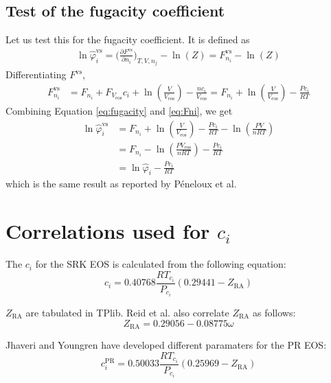 \documentclass[english]{../thermomemo/thermomemo}
\newcommand{\eos}{\ensuremath{\text{eos}}\xspace}
\begin{document}
\subsection{Test of the fugacity coefficient}
Let us test this for the fugacity coefficient. It is defined as
\begin{align}
  \ln \hat{\varphi}_i^{\text{vs}} = \biggl( \frac{\partial F^{\text{vs}}}{\partial n_i} \biggr)_{T,V,n_j} - \ln \left( Z \right) = F_{n_i}^{\text{vs}} - \ln \left( Z \right)
  \label{eq:fugacity}
\end{align}
Differentiating $F^{\text{vs}}$,
\begin{align}
  F_{n_i}^{\text{vs}} &= F_{n_i} + F_{V_{\eos}}c_i  + \ln \left(\frac{V}{V_{\eos}} \right) - \frac{n c_i}{V_{\eos}} = F_{n_i} + \ln \left(\frac{V}{V_{\eos}} \right) - \frac{P c_i}{RT}
  \label{eq:Fni}
\end{align}
Combining Equation \ref{eq:fugacity} and \ref{eq:Fni}, we get
\begin{align}
  \ln \hat{\varphi}_i^{\text{vs}} &= F_{n_i} + \ln \left(\frac{V}{V_{\eos}} \right) - \frac{P c_i}{RT} - \ln \left( \frac{PV}{n RT} \right) \\
                      &= F_{n_i} - \ln \left( \frac{PV_{\eos}}{n RT} \right) - \frac{P c_i}{RT} \\
  &= \ln \hat{\varphi}_i - \frac{P c_i}{RT}
  \label{eq:fugacity2}
\end{align}
which is the same result as reported by P{\'e}neloux et al.


\section{Correlations used for $c_i$}
The $c_i$ for the SRK EOS is calculated from the following equation:
\begin{equation}
  c_i = 0.40768\frac{R T_{c_i}}{P_{c_i}}\left(0.29441- Z_{\text{RA}}\right)
\label{eq:ci}
\end{equation}

$Z_{\text{RA}}$ are tabulated in TPlib. Reid et al. \cite{Reid1987}
also correlate $Z_{\text{RA}}$ as follows:
\begin{equation}
  Z_{\text{RA}} = 0.29056 - 0.08775 \omega
\label{eq:zra}
\end{equation}

Jhaveri and Youngren \cite{Jhaveri1988} have developed different paramaters for the PR EOS:
\begin{equation}
  c_i^{\text{PR}} = 0.50033\frac{R T_{c_i}}{P_{c_i}}\left(0.25969- Z_{\text{RA}}\right)
\label{eq:ci_PR}
\end{equation}
\end{document}
